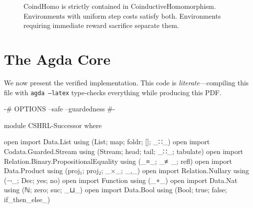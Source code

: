 \documentclass[9pt,a4paper]{article}
\theoremstyle{plain}
\theoremstyle{definition}
\theoremstyle{remark}
\begin{document}
\begin{figure}[H]
\centering
{}
\caption{CoindHomo is strictly contained in CoinductiveHomomorphism.  Environments with uniform step costs satisfy both.  Environments requiring immediate reward sacrifice separate them.}
\label{fig:containment}
\end{figure}


\section{The Agda Core}\label{sec:agda-core}

We now present the verified implementation.  This code is \emph{literate}---compiling this file with \texttt{agda --latex} type-checks everything while producing this PDF.

\begin{code}
{-# OPTIONS --safe --guardedness #-}

module CSHRL-Successor where

open import Data.List using (List; map; foldr; []; _∷_)
open import Codata.Guarded.Stream using (Stream; head; tail; _∷_; tabulate)
open import Relation.Binary.PropositionalEquality using (_≡_; _≢_; refl)
open import Data.Product using (proj₁; proj₂; _×_; _,_)
open import Relation.Nullary using (¬_; Dec; yes; no)
open import Function using (_∘_)
open import Data.Nat using (ℕ; zero; suc; _⊔_)
open import Data.Bool using (Bool; true; false; if_then_else_)
\end{code}
\end{document}
